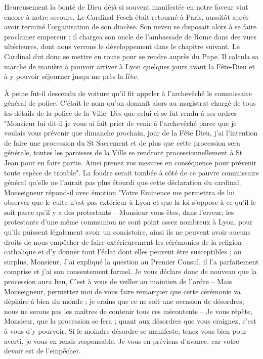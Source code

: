 \documentclass[11pt,a4paper]{report}
\begin{document}
Heureusement la bonté de Dieu déjà si souvent manifestée en notre faveur vint encore à notre secours. Le Cardinal Fesch était retourné à Paris, aussitôt après avoir terminé l'organisation de son diocèse. Son neveu se disposait alors à se faire proclamer empereur ; il chargea son oncle de l'ambassade de Rome dans des vues ultérieures, dont nous verrons le développement dans le chapitre suivant. Le Cardinal dut donc se mettre en route pour se rendre auprès du Pape. Il calcula sa marche de manière à pouvoir arriver à Lyon quelques jours avant la Fête-Dieu et à y pouvoir séjourner jusqu me près la fête.

À peine fut-il descendu de voiture qu'il fit appeler à l'archevêché le commissaire général de police. C'était le nom qu'on donnait alors au magistrat chargé de tous les détails de la police de la Ville. Dès que celui-ci se fut rendu à ses ordres "Monsieur lui dit-il je vous ai fait prier de venir à l'archevêché parce que je voulais vous prévenir que dimanche prochain, jour de la Fête Dieu, j'ai l'intention de faire une procession du St Sacrement et de plus que cette procession sera générale, toutes les paroisses de la Ville se rendront processionnellement à St Jean pour en faire partie. Ainsi prenez vos mesures en conséquence pour prévenir toute espèce de trouble". La foudre serait tombée à côté de ce pauvre commissaire général qu'elle ne l'aurait pas plus étourdi que cette déclaration du cardinal. Monseigneur répond-il avec émotion "Votre Eminence me permettra de lui observer que le culte n'est pas extérieur à Lyon et que la loi s'oppose à ce qu'il le soit parce qu'il y a des protestants -- Monsieur vous êtes, dans l'erreur, les protestants d'une même communion ne sont point assez nombreux à Lyon, pour qu'ils puissent légalement avoir un consistoire, ainsi ils ne peuvent avoir aucuns droits de nous empêcher de faire extérieurement les cérémonies de la religion catholique et d'y donner tout l'éclat dont elles peuvent être susceptibles ; au surplus, Monsieur, J'ai expliqué la question au Premier Consul, il l'a parfaitement comprise et j'ai son consentement formel. Je vous déclare donc de nouveau que la procession aura lieu, C'est à vous de veiller au maintien de l'ordre -- Mais Monseigneur, permettez moi de vous faire remarquer que cette cérémonie va déplaire à bien du monde ; je crains que ce ne soit une occasion de désordres, nous ne serons pas les maîtres de contenir tous ces mécontents -- Je vous répète, Monsieur, que la procession se fera ; quant aux désordres que vous craignez, c'est à vous d'y pourvoir. Si le moindre désordre se manifeste, tenez vous bien pour averti, je vous en rends responsable. Je vous en préviens d'avance, car votre devoir est de l'empêcher.
\end{document}
